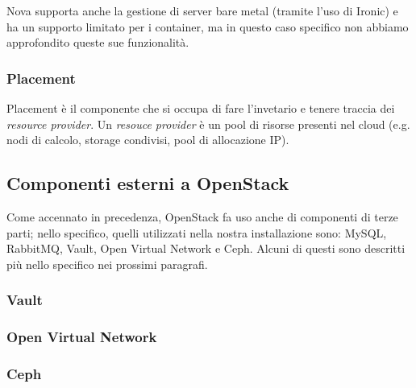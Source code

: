 Nova supporta anche la gestione di server bare metal (tramite l'uso di Ironic) e ha un supporto limitato per i container, ma in questo caso specifico non abbiamo approfondito queste sue funzionalità.

\subsubsection{Placement}\label{sec:openstack_placement}
Placement è il componente che si occupa di fare l'invetario e tenere traccia dei \textit{resource provider}. Un \textit{resouce provider} è un pool di risorse presenti nel cloud (e.g. nodi di calcolo, storage condivisi, pool di allocazione IP).

\subsection{Componenti esterni a OpenStack}\label{sec:openstack_external_components}
Come accennato in precedenza, OpenStack fa uso anche di componenti di terze parti; nello specifico, quelli utilizzati nella nostra installazione sono: MySQL, RabbitMQ, Vault, Open Virtual Network e Ceph. Alcuni di questi sono descritti più nello specifico nei prossimi paragrafi.

\subsubsection{Vault}

\subsubsection{Open Virtual Network}

\subsubsection{Ceph}